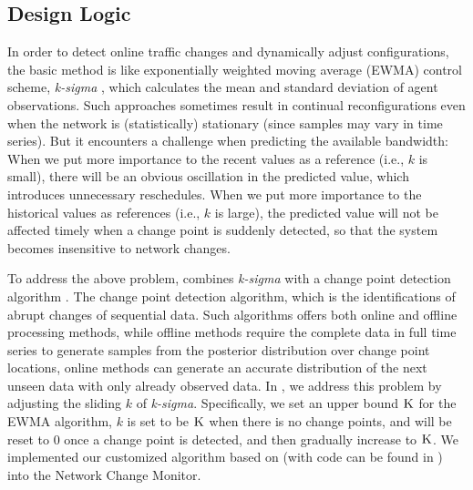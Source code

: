 {\subsection{Design Logic}
\label{subsec:dynamic:prediction}
In order to detect online traffic changes and dynamically adjust configurations, the basic method is like exponentially weighted moving average (EWMA) control scheme, \textit{k-sigma} \cite{roberts1959control,lucas1990exponentially}, which calculates the mean and standard deviation of agent observations. Such approaches sometimes result in continual reconfigurations even when the network is (statistically) stationary (since samples may vary in time series). But it encounters a  challenge when predicting the available bandwidth: When we put more importance to the recent values as a reference (i.e., $k$ is small), there will be an obvious oscillation in the predicted value, which introduces unnecessary reschedules. When we put more importance to the historical values as references (i.e., $k$ is large), the predicted value will not be affected timely when a change point is suddenly detected, so that the system becomes insensitive to network changes.

To address the above problem, \newname combines \textit{k-sigma}  with  a change point detection algorithm \cite{adams2007bayesian}.  The change point detection algorithm, which is the identifications of abrupt changes of sequential data. Such algorithms offers both online and offline processing methods, while offline methods \cite{smith1975bayesian,stephens1994bayesian,barry1993bayesian,green1995reversible} require the complete data in full time series to generate samples from the posterior distribution over change point locations, online methods \cite{page1955test,desobry2005online,lorden1971procedures} can generate an accurate distribution of the next unseen data with only already observed data.  In \newname, we address this problem by adjusting the sliding $k$ of \textit{k-sigma}. Specifically, we set an upper bound $\textsc{K}$ for the EWMA algorithm, $k$ is set to be $\textsc{K}$ when there is no change points, and will be reset to $0$ once a change point is detected, and then gradually increase to $\textsc{K}$. We implemented our customized algorithm based on \cite{adams2007bayesian} (with code can be found in \cite{BOCDcode}) into the Network Change Monitor.

}
